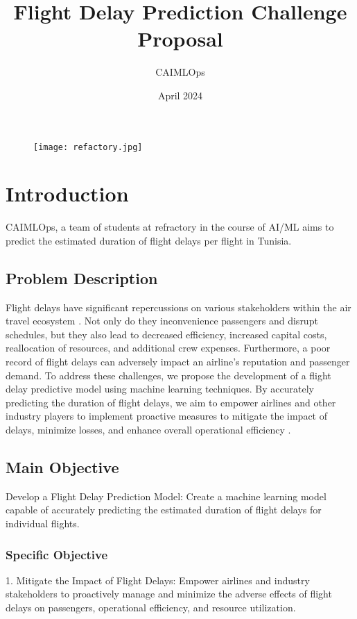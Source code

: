 \documentclass{article}
\title{Flight Delay Prediction Challenge Proposal}
\author{CAIMLOps}
\date{April 2024}
\begin{document}
\begin{figure}
    \centering
    \texttt{[image: refactory.jpg]}
\end{figure}
\maketitle
\titlepage
\tableofcontents

\newpage
{}
\section{Introduction}
CAIMLOps, a team of students at refractory in the course of AI/ML aims to predict the estimated duration of flight delays per flight in Tunisia.
\subsection{Problem Description}
Flight delays have significant repercussions on various stakeholders within the air travel ecosystem \cite{sternberg2017review}. Not only do they inconvenience passengers and disrupt schedules, but they also lead to decreased efficiency, increased capital costs, reallocation of resources, and additional crew expenses. Furthermore, a poor record of flight delays can adversely impact an airline's reputation and passenger demand. To address these challenges, we propose the development of a flight delay predictive model using machine learning techniques. By accurately predicting the duration of flight delays, we aim to empower airlines and other industry players to implement proactive measures to mitigate the impact of delays, minimize losses, and enhance overall operational efficiency \cite{alfarhood2024predicting}.

\subsection{\textbf{Main Objective}}
Develop a Flight Delay Prediction Model: Create a machine learning model capable of accurately predicting the estimated duration of flight delays for individual flights.
\subsubsection{\textbf{Specific Objective}}
1. Mitigate the Impact of Flight Delays: Empower airlines and industry stakeholders to proactively manage and minimize the adverse effects of flight delays on passengers, operational efficiency, and resource utilization.
\end{document}
